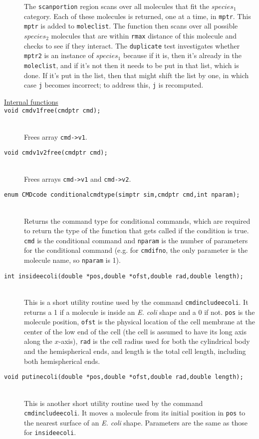 \documentclass {scrbook}
\newcommand {\ttt} {\texttt}
\begin{document}
\begin{description}
The \ttt{scanportion} region scans over all molecules that fit the $species_1$ category. Each of these molecules is returned, one at a time, in \ttt{mptr}. This \ttt{mptr} is added to \ttt{moleclist}. The function then scans over all possible $species_2$ molecules that are within \ttt{rmax} distance of this molecule and checks to see if they interact. The \ttt{duplicate} test investigates whether \ttt{mptr2} is an instance of $species_1$ because if it is, then it's already in the \ttt{moleclist}, and if it's not then it needs to be put in that list, which is done. If it's put in the list, then that might shift the list by one, in which case \ttt{j} becomes incorrect; to address this, \ttt{j} is recomputed.

\item[\underline{Internal functions}]

\item[\ttt{void cmdv1free(cmdptr cmd);}]
\hfill \\
Frees array \ttt{cmd->v1}.

\item[\ttt{void cmdv1v2free(cmdptr cmd);}]
\hfill \\
Frees arrays \ttt{cmd->v1} and \ttt{cmd->v2}.

\item[\ttt{enum CMDcode conditionalcmdtype(simptr sim,cmdptr cmd,int nparam);}]
\hfill \\
Returns the command type for conditional commands, which are required to return the type of the function that gets called if the condition is true. \ttt{cmd} is the conditional command and \ttt{nparam} is the number of parameters for the conditional command (e.g. for \ttt{cmdifno}, the only parameter is the molecule name, so \ttt{nparam} is 1).

\item[\ttt{int insideecoli(double *pos,double *ofst,double rad,double length);}]
\hfill \\
This is a short utility routine used by the command \ttt{cmdincludeecoli}. It returns a 1 if a molecule is inside an \emph{E. coli} shape and a 0 if not. \ttt{pos} is the molecule position, \ttt{ofst} is the physical location of the cell membrane at the center of the low end of the cell (the cell is assumed to have its long axis along the $x$-axis), \ttt{rad} is the cell radius used for both the cylindrical body and the hemispherical ends, and length is the total cell length, including both hemispherical ends.

\item[\ttt{void putinecoli(double *pos,double *ofst,double rad,double length);}]
\hfill \\
This is another short utility routine used by the command \ttt{cmdincludeecoli}. It moves a molecule from its initial position in \ttt{pos} to the nearest surface of an \emph{E. coli} shape. Parameters are the same as those for \ttt{insideecoli}.


\end{description}
\end{document}
